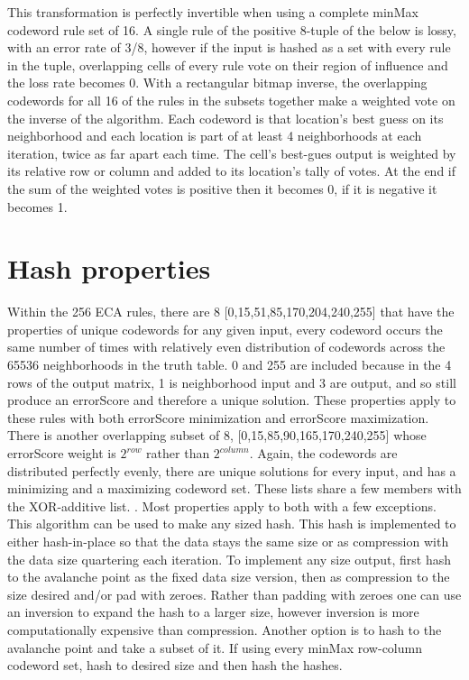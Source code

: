 \documentclass[11pt]{article}
\begin{document}
This transformation is perfectly invertible when using a complete minMax codeword rule set of 16. A single rule of the positive 8-tuple of the below is lossy, with an error rate of 3/8, however if the input is hashed as a set with every rule in the tuple, overlapping cells of every rule vote on their region of influence and the loss rate becomes 0. With a rectangular bitmap inverse, the overlapping codewords for all 16 of the rules in the subsets together make a weighted vote on the inverse of the algorithm. Each codeword is that location's best guess on its neighborhood and each location is part of at least 4 neighborhoods at each iteration, twice as far apart each time. The cell's best-gues output is weighted by its relative row or column and added to its location's tally of votes. At the end if the sum of the weighted votes is positive then it becomes 0, if it is negative it becomes 1. \\

\section{Hash properties}

Within the 256 ECA rules, there are 8 [0,15,51,85,170,204,240,255] that have the properties of unique codewords for any given input, every codeword occurs the same number of times with relatively even distribution of codewords across the 65536 neighborhoods in the truth table. 0 and 255 are included because in the 4 rows of the output matrix, 1 is neighborhood input and 3 are output, and so still produce an errorScore and therefore a unique solution. These properties apply to these rules with both errorScore minimization and errorScore maximization. \\

There is another overlapping subset of 8, [0,15,85,90,165,170,240,255] whose errorScore weight is $2^{row}$ rather than $2^{column}$. Again, the codewords are distributed perfectly evenly, there are unique solutions for every input, and has a minimizing and a maximizing codeword set. These lists share a few members with the XOR-additive list. \cite{xorAdditive}. Most properties apply to both with a few exceptions.\\

This algorithm can be used to make any sized hash. This hash is implemented to either hash-in-place so that the data stays the same size or as compression with the data size quartering each iteration. To implement any size output, first hash to the avalanche point as the fixed data size version, then as compression to the size desired and/or pad with zeroes. Rather than padding with zeroes one can use an inversion to expand the hash to a larger size, however inversion is more computationally expensive than compression. Another option is to hash to the avalanche point and take a subset of it. If using every minMax row-column codeword set, hash to desired size and then hash the hashes.\\
\end{document}
